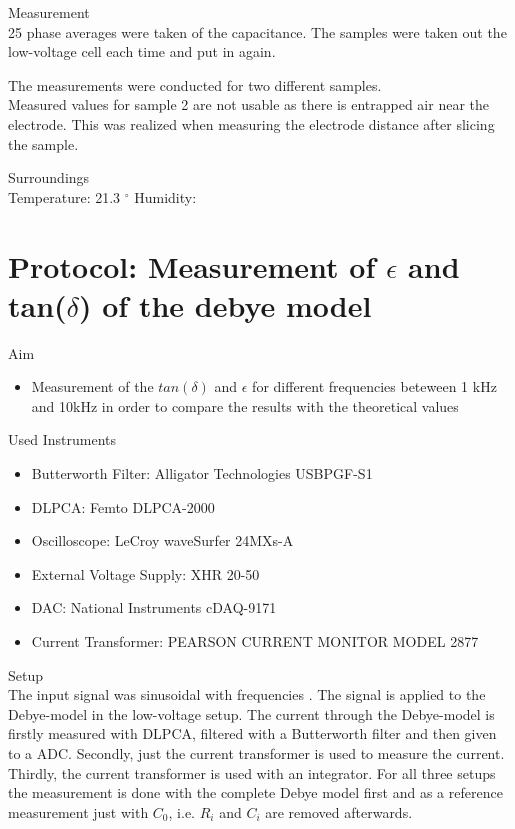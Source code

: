 \large{Measurement} \\
25 phase averages were taken of the capacitance. The samples were taken out the low-voltage cell each time and put in again.

The measurements were conducted for two different samples.\\

Measured values for sample 2 are not usable as there is entrapped air near the electrode. This was realized when measuring the electrode distance after slicing the sample.

{\large Surroundings} \\
Temperature: 21.3 $^{\circ}$
Humidity: 

\section{Protocol: Measurement of $\epsilon$ and tan($\delta$) of the debye model}
{\large Aim} \\
\begin{itemize}
\item Measurement of the $tan(\delta)$ and $\epsilon$ for different frequencies beteween 1 kHz and 10kHz in order to compare the results with the theoretical values
\end{itemize}


\large{Used Instruments} 
\begin{itemize}
 \item Butterworth Filter: Alligator Technologies USBPGF-S1
 \item DLPCA: Femto DLPCA-2000
 \item Oscilloscope: LeCroy waveSurfer 24MXs-A
 \item External Voltage Supply:  XHR 20-50
 \item DAC: National Instruments cDAQ-9171
 \item Current Transformer: PEARSON CURRENT
MONITOR MODEL 2877

\end{itemize}


\large{Setup} \\
The input signal was  sinusoidal with frequencies . The signal is applied to the Debye-model in the low-voltage setup. The current through the Debye-model is firstly measured with DLPCA, filtered with a Butterworth filter and then given to a ADC. Secondly, just the current transformer is used to measure the current. Thirdly, the current transformer is used with an integrator. 
For all three setups the measurement is done with the complete Debye model first and as a reference measurement just with $C_0$, i.e. $R_i$ and $C_i$ are removed afterwards.\\ 

